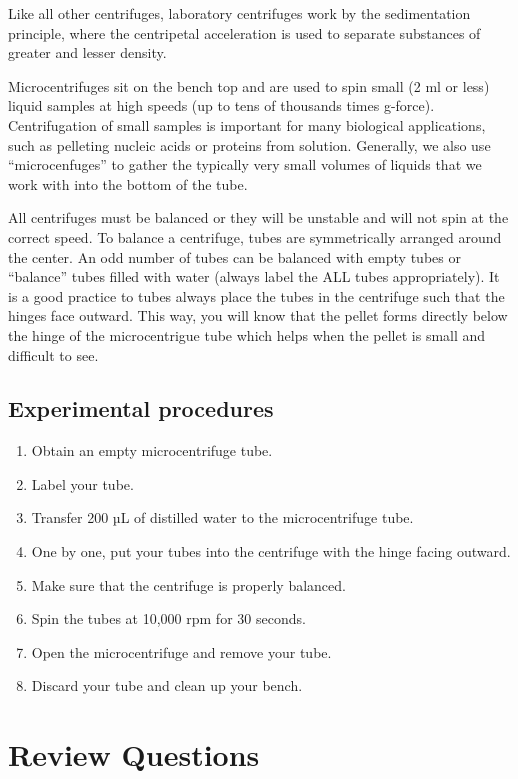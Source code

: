 \documentclass[]{book}
\providecommand{\tightlist}{%
  \setlength{\itemsep}{0pt}\setlength{\parskip}{0pt}}
\begin{document}
Like all other centrifuges, laboratory centrifuges work by the
sedimentation principle, where the centripetal acceleration is used to
separate substances of greater and lesser density.

Microcentrifuges sit on the bench top and are used to spin small (2 ml
or less) liquid samples at high speeds (up to tens of thousands times
g-force). Centrifugation of small samples is important for many
biological applications, such as pelleting nucleic acids or proteins
from solution. Generally, we also use ``microcenfuges'' to gather the
typically very small volumes of liquids that we work with into the
bottom of the tube.

All centrifuges must be balanced or they will be unstable and will not
spin at the correct speed. To balance a centrifuge, tubes are
symmetrically arranged around the center. An odd number of tubes can be
balanced with empty tubes or ``balance'' tubes filled with water (always
label the ALL tubes appropriately). It is a good practice to tubes
always place the tubes in the centrifuge such that the hinges face
outward. This way, you will know that the pellet forms directly below
the hinge of the microcentrigue tube which helps when the pellet is
small and difficult to see.

\subsection{Experimental procedures}\label{experimental-procedures-7}

\begin{enumerate}
\def\labelenumi{\arabic{enumi}.}
\tightlist
\item
  Obtain an empty microcentrifuge tube.
\item
  Label your tube.
\item
  Transfer 200 µL of distilled water to the microcentrifuge tube.
\item
  One by one, put your tubes into the centrifuge with the hinge facing
  outward.
\item
  Make sure that the centrifuge is properly balanced.
\item
  Spin the tubes at 10,000 rpm for 30 seconds.
\item
  Open the microcentrifuge and remove your tube.
\item
  Discard your tube and clean up your bench.
\end{enumerate}

\section{Review Questions}\label{review-questions-4}
\end{document}
